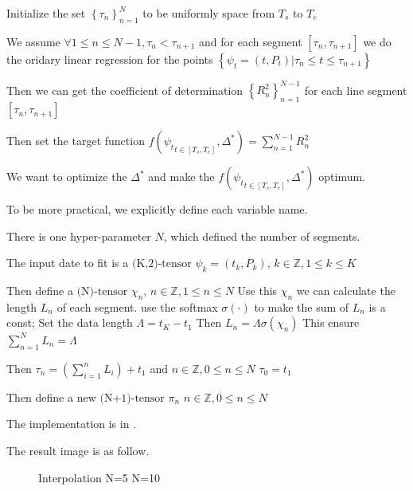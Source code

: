 \documentclass{article}
\theoremstyle{definition} %
\begin{document}
Initialize the set
$\left\{\tau_n\right\}_{n=1}^N$
to be uniformly space from $T_s$ to $T_e$

We assume
$\forall 1\leq n\leq N-1,\tau_n<\tau_{n+1}$
and for each segment
$\left[\tau_n,\tau_{n+1}\right]$
we do the oridary linear regression
for the points
$\left\{\psi_t=\left(t,P_t\right)|
    \tau_n\leq t\leq\tau_{n+1}\right\}$

Then we can get the coefficient of determination
$\left\{R^2_n\right\}_{n=1}^{N-1}$
for each line segment
$\left[\tau_n,\tau_{n+1}\right]$

Then set the target function
$f({\psi_t}_{t\in\left[T_s,T_e\right]},
    \Delta^*)
    =\sum_{n=1}^{N-1}R^2_n$

We want to optimize the $\Delta^*$
and make the
$f({\psi_t}_{t\in\left[T_s,T_e\right]},
    \Delta^*)$
optimum.

To be more practical, we explicitly define
each variable name.

There is one hyper-parameter $N$, which
defined the number of segments.

The input date to fit is a
$\text{(K,2)-tensor}$
$\psi_k=\left(t_k,P_k\right)$,
$k\in\mathbb{Z},1\leq k\leq K$

Then define a $\text{(N)-tensor}$ $\chi_n$,
$n\in\mathbb{Z},1\leq n\leq N$
Use this $\chi_n$ we can calculate
the length $L_n$ of each segment.
use the softmax $\sigma(\cdot)$
to make the sum of $L_n$
is a const;
Set the data length $\Lambda=t_K-t_1$
Then $L_n=\Lambda\sigma(\chi_n)$
This ensure
$\sum_{n=1}^{N}L_n=\Lambda$

Then $\tau_n=(\sum_{i=1}^{n}L_i)+t_1$
and
$n\in\mathbb{Z},0\leq n\leq N$
$\tau_0=t_1$

Then define a new $\text{(N+1)-tensor}$
$\pi_n$
$n\in\mathbb{Z},0\leq n\leq N$

The implementation is in
\cite[computeGraph]{Data_process}.

The result image is as follow.
\begin{figure}[!ht]
    \centering
    \caption{Interpolation N=5 N=10}
\end{figure}
\end{document}
